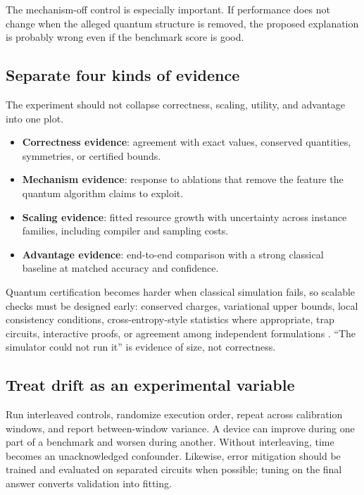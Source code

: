 The mechanism-off control is especially important. If performance does not change when the alleged quantum structure is removed, the proposed explanation is probably wrong even if the benchmark score is good.

\subsection{Separate four kinds of evidence}

The experiment should not collapse correctness, scaling, utility, and advantage into one plot.

\begin{itemize}
  \item \textbf{Correctness evidence}: agreement with exact values, conserved quantities, symmetries, or certified bounds.
  \item \textbf{Mechanism evidence}: response to ablations that remove the feature the quantum algorithm claims to exploit.
  \item \textbf{Scaling evidence}: fitted resource growth with uncertainty across instance families, including compiler and sampling costs.
  \item \textbf{Advantage evidence}: end-to-end comparison with a strong classical baseline at matched accuracy and confidence.
\end{itemize}

Quantum certification becomes harder when classical simulation fails, so scalable checks must be designed early: conserved charges, variational upper bounds, local consistency conditions, cross-entropy-style statistics where appropriate, trap circuits, interactive proofs, or agreement among independent formulations \citep{eisert2020}. ``The simulator could not run it'' is evidence of size, not correctness.

\subsection{Treat drift as an experimental variable}

Run interleaved controls, randomize execution order, repeat across calibration windows, and report between-window variance. A device can improve during one part of a benchmark and worsen during another. Without interleaving, time becomes an unacknowledged confounder. Likewise, error mitigation should be trained and evaluated on separated circuits when possible; tuning on the final answer converts validation into fitting.

